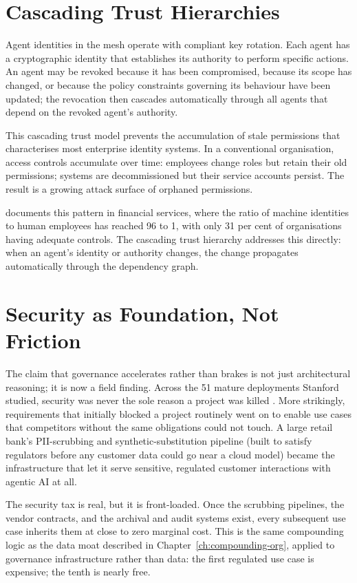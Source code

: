 \section{Cascading Trust Hierarchies}

Agent identities in the mesh operate with compliant key rotation. Each agent has a cryptographic identity that establishes its authority to perform specific actions. An agent may be revoked because it has been compromised, because its scope has changed, or because the policy constraints governing its behaviour have been updated; the revocation then cascades automatically through all agents that depend on the revoked agent's authority.

This cascading trust model prevents the accumulation of stale permissions that characterises most enterprise identity systems. In a conventional organisation, access controls accumulate over time: employees change roles but retain their old permissions; systems are decommissioned but their service accounts persist. The result is a growing attack surface of orphaned permissions.

\textcite{CyberArk2025} documents this pattern in financial services, where the ratio of machine identities to human employees has reached 96 to 1, with only 31 per cent of organisations having adequate controls. The cascading trust hierarchy addresses this directly: when an agent's identity or authority changes, the change propagates automatically through the dependency graph.

\section{Security as Foundation, Not Friction}

The claim that governance accelerates rather than brakes is not just architectural reasoning; it is now a field finding. Across the 51 mature deployments Stanford studied, security was never the sole reason a project was killed \parencite{Pereira2026Playbook}. More strikingly, requirements that initially blocked a project routinely went on to enable use cases that competitors without the same obligations could not touch. A large retail bank's PII-scrubbing and synthetic-substitution pipeline (built to satisfy regulators before any customer data could go near a cloud model) became the infrastructure that let it serve sensitive, regulated customer interactions with agentic AI at all.

The security tax is real, but it is front-loaded. Once the scrubbing pipelines, the vendor contracts, and the archival and audit systems exist, every subsequent use case inherits them at close to zero marginal cost. This is the same compounding logic as the data moat described in Chapter~\ref{ch:compounding-org}, applied to governance infrastructure rather than data: the first regulated use case is expensive; the tenth is nearly free.

